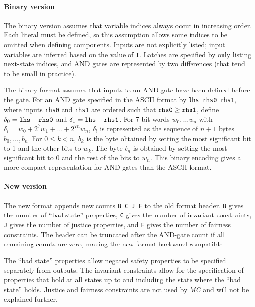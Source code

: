 \documentclass[12pt,a4paper,twoside,openright]{report}
\begin{document}
{{\paragraph{Binary version}{
The binary version assumes that variable indices always
occur in increasing order. Each literal must be defined, so this assumption
allows some indices to be omitted when defining components.
Inputs are not explicitly listed; input variables are inferred based on
the value of \verb,I,.
Latches are specified by only listing next-state
indices, and AND gates are represented by two differences (that tend to be
small in practice).

The binary format assumes that inputs to an AND gate
have been defined before the gate.
For an AND gate specified in the ASCII format by \verb,lhs rhs0 rhs1,,
where inputs \verb,rhs0, and \verb,rhs1, are ordered such that
$\verb,rhs0, \geq \verb,rhs1,$, define
$\delta_0 = \verb,lhs, - \verb,rhs0,$
and
$\delta_1 = \verb,lhs, - \verb,rhs1,$.
For 7-bit words $w_0, \ldots w_n$ with
$\delta_i = w_0 + 2^7w_1 + \ldots + 2^{7n}w_n$,
$\delta_i$ is represented as the sequence of $n + 1$ bytes
$b_0, \ldots, b_n$.
For $0 \leq k < n$, $b_k$ is the byte obtained by setting the most
significant bit to 1 and the other bits to $w_k$. The byte
$b_n$ is obtained by setting the most
significant bit to 0 and the rest of the bits to $w_n$.
This binary encoding gives a more compact representation for AND
gates than the ASCII format.
}

\paragraph{New version} {
The new format appends new counts \verb,B C J F, to the old
format header.
\verb,B, gives the number of ``bad state'' properties,
\verb,C, gives the number of invariant constraints,
\verb,J, gives the number of justice properties, and
\verb,F, gives the number of fairness constraints.
The header can be truncated
after the AND-gate count if all remaining counts are
zero, making the new format
backward compatible.

The ``bad state'' properties allow negated safety properties to be specified
separately from outputs.
The invariant constraints allow for the specification of properties that
hold at all states up to and including the state where the ``bad state''
holds.
Justice and fairness constraints are not used by
\emph{MC} and will not be explained further.

}}}
\end{document}

